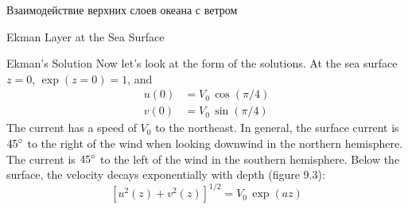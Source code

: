 \begin{chapter}{Взаимодействие верхних слоев океана с ветром}
\begin{section}{Ekman Layer at the Sea Surface}
\begin{paragraph}{Ekman's Solution}
Now let's look at the form of the solutions. At the sea surface $z = 0$,
$\exp(z=0) = 1$, and
\begin{subequations}
\begin{align}
u(0) &= V_0\, \cos(\pi/4)  \\
v(0) &= V_0\, \sin(\pi/4)
\end{align}
\end{subequations}
The current has a speed of $V_0$ to the northeast. In general, the
surface current is ${45}^\circ$ to the right of the wind when looking
downwind in the northern hemisphere. The current is ${45}^\circ$ to the
left of the wind in the southern hemisphere. Below the surface, the
velocity decays exponentially with depth (figure 9.3):
\begin{equation}
\left[u^2(z) + v^2(z) \right]^{1/2} =V_0\,\exp(az)
\end{equation}
%


\end{paragraph}
\end{section}
\end{chapter}

